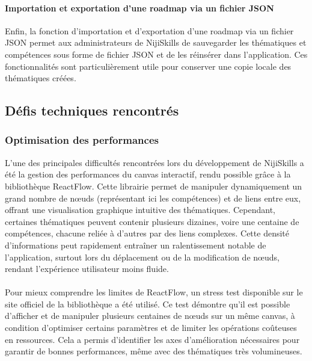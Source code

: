 \documentclass[12pt]{article}
\begin{document}
\paragraph{Importation et exportation d'une roadmap via un fichier JSON\\}
Enfin, la fonction d'importation et d'exportation d'une roadmap via un fichier JSON permet aux administrateurs de NijiSkills de sauvegarder les thématiques et compétences sous forme de fichier JSON et de les réinsérer dans l'application. Ces fonctionnalités sont particulièrement utile pour conserver une copie locale des thématiques créées.
\subsection{Défis techniques rencontrés}
\subsubsection{Optimisation des performances}
L’une des principales difficultés rencontrées lors du développement de NijiSkills a été la gestion des performances du canvas interactif, rendu possible grâce à la bibliothèque ReactFlow. Cette librairie permet de manipuler dynamiquement un grand nombre de nœuds (représentant ici les compétences) et de liens entre eux, offrant une visualisation graphique intuitive des thématiques. Cependant, certaines thématiques peuvent contenir plusieurs dizaines, voire une centaine de compétences, chacune reliée à d’autres par des liens complexes. Cette densité d’informations peut rapidement entraîner un ralentissement notable de l’application, surtout lors du déplacement ou de la modification de nœuds, rendant l’expérience utilisateur moins fluide.
\\\\
Pour mieux comprendre les limites de ReactFlow, un stress test disponible sur le site officiel de la bibliothèque a été utilisé. Ce test démontre qu’il est possible d’afficher et de manipuler plusieurs centaines de nœuds sur un même canvas, à condition d’optimiser certains paramètres et de limiter les opérations coûteuses en ressources. Cela a permis d’identifier les axes d’amélioration nécessaires pour garantir de bonnes performances, même avec des thématiques très volumineuses.
\end{document}
